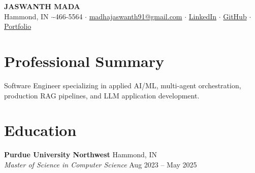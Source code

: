 \documentclass[10pt, letterpaper]{article}
\begin{document}
\begin{center}
    {\Huge \bfseries \color{primary} JASWANTH MADA} \\[2pt]
    \small
    Hammond, IN \quad$\cdot$-466-5564 \quad$\cdot$\quad 
    \href{mailto:madhajaswanth91@gmail.com}{madhajaswanth91@gmail.com} \quad$\cdot$\quad 
    \href{https://www.linkedin.com/in/jaswanthmadha/}{LinkedIn} \quad$\cdot$\quad 
    \href{https://github.com/Jaswanth19-596/}{GitHub} \quad$\cdot$\quad 
    \href{https://madajaswanth.netlify.app/}{Portfolio}
\end{center}

\vspace{-6pt}

\section{Professional Summary}
Software Engineer specializing in applied AI/ML, multi-agent orchestration, production RAG pipelines, and LLM application development.

\section{Education}
\textbf{Purdue University Northwest} \hfill Hammond, IN \\
\textit{Master of Science in Computer Science} \hfill Aug 2023 -- May 2025

\end{document}
